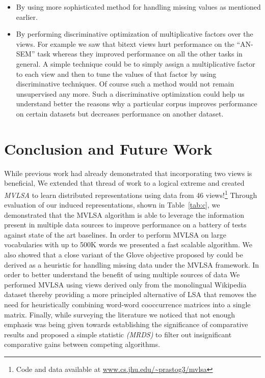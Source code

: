 \documentclass[11pt]{article}
\begin{document}
{\begin{itemize}[leftmargin=*]
  have been caused due to lack of PMI type features have been reported
  to work well in \cite{levy2014neural}.  
\item By using more sophisticated method for handling missing values
  as mentioned earlier.
\item By performing discriminative optimization of multiplicative
  factors over the views. For example we saw that bitext views hurt
  performance on the ``AN-SEM'' task whereas they improved performance
  on all the other tasks in general. A simple technique could be to
  simply assign a multiplicative factor to each view and 
  then to tune the values of that factor by using discriminative
  techniques. Of course such a method would not remain unsupervised any
  more. Such a discriminative optimization could help us understand
  better the reasons why a particular corpus improves performance on
  certain datasets but decreases performance on another dataset. %
\end{itemize}
}

\section{Conclusion and Future Work}
While previous work had already demonstrated that incorporating two views
is beneficial, We extended that thread of work to a
logical extreme and created \emph{MVLSA} to learn distributed 
representations using data from 46 views!\footnote{Code and data available at \url{www.cs.jhu.edu/~prastog3/mvlsa}}
Through evaluation of our
induced representations, shown in Table~\ref{tab:c}, we demonstrated that
the MVLSA algorithm is able to leverage the information present in  
multiple data sources to improve performance on a battery of tests
against state of the art baselines. In order to
 perform MVLSA on large vocabularies with up to 500K words
we presented a fast scalable algorithm. We also showed that a close
variant of the Glove objective proposed by 
 could be derived as a heuristic for
handling missing data under the MVLSA framework. In order to better
understand the benefit of using multiple sources of data We 
performed  MVLSA using views derived only from the monolingual Wikipedia
dataset thereby providing a more principled alternative of LSA that
removes the need for heuristically combining word-word cooccurrence 
matrices into a single matrix. Finally, while surveying the literature
we noticed that not enough emphasis was being given towards
establishing the significance of 
comparative results and proposed a simple statistic \emph{(MRDS)}
to filter out insignificant comparative gains between competing
algorithms.
\end{document}
